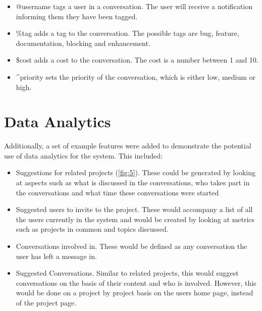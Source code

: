 \documentclass{l4proj}
\begin{document}
\begin{itemize}
\item @username tags a user in a conversation.  The user will receive a notification informing them they have been tagged.
\item \%tag adds a tag to the conversation.  The possible tags are bug, feature, documentation, blocking and enhancement.
\item \$cost adds a cost to the conversation.  The cost is a number between 1 and 10.
\item \textasciicircum priority sets the priority of the conversation, which is either low, medium or high.
\end{itemize}

\newpage

\section{Data Analytics}
Additionally, a set of example features were added to demonstrate the potential use of data analytics for the system.  This included:

\begin{itemize}
\item Suggestions for related projects (\ref{fig:5}).  These could be generated by looking at aspects such as what is discussed in the conversations, who takes part in the conversations and what time these conversations were started
\item Suggested users to invite to the project.  These would accompany a list of all the users currently in the system and would be created by looking at metrics such as projects in common and topics discussed.
\item Conversations involved in.  These would be defined as any conversation the user has left a message in.
\item Suggested Conversations.  Similar to related projects, this would suggest conversations on the basis of their content and who is involved.  However, this would be done on a project by project basis on the users home page, instead of the project page.
\end{itemize}
\end{document}
